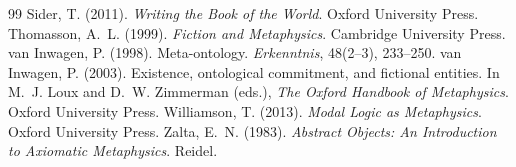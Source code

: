 \documentclass{situationist-preprint}
\begin{document}
\begin{thebibliography}{99}
 Sider, T. (2011). \emph{Writing the Book of the World}. Oxford University Press.
 Thomasson, A.~L. (1999). \emph{Fiction and Metaphysics}. Cambridge University Press.
 van Inwagen, P. (1998). Meta-ontology. \emph{Erkenntnis}, 48(2--3), 233--250.
 van Inwagen, P. (2003). Existence, ontological commitment, and fictional entities. In M.~J. Loux and D.~W. Zimmerman (eds.), \emph{The Oxford Handbook of Metaphysics}. Oxford University Press.
 Williamson, T. (2013). \emph{Modal Logic as Metaphysics}. Oxford University Press.
 Zalta, E.~N. (1983). \emph{Abstract Objects: An Introduction to Axiomatic Metaphysics}. Reidel.
\end{thebibliography}
\end{document}
